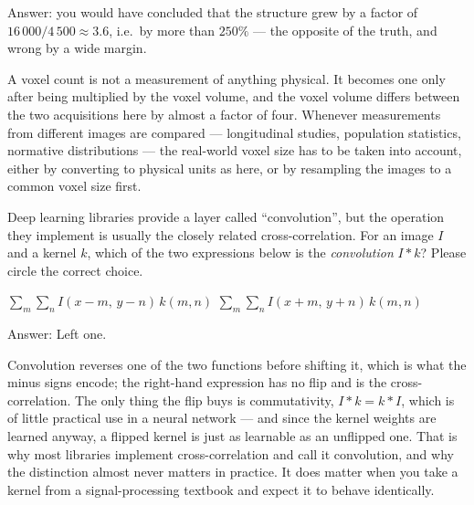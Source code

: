 \documentclass[11pt]{exam}
\newcommand{\answerspace}[1]{\ifprintanswers\else\vspace{#1}\fi}
\begin{document}
\begin{questions}
\begin{parts}
  \begin{solution}
    Answer: you would have concluded that the structure grew by a factor of
    $16\,000 / 4\,500 \approx 3.6$, i.e.\ by more than $250\%$ --- the opposite of the truth, and
    wrong by a wide margin.

    A voxel count is not a measurement of anything physical. It becomes one only after being
    multiplied by the voxel volume, and the voxel volume differs between the two acquisitions here
    by almost a factor of four. Whenever measurements from different images are compared ---
    longitudinal studies, population statistics, normative distributions --- the real-world voxel
    size has to be taken into account, either by converting to physical units as here, or by
    resampling the images to a common voxel size first.
  \end{solution}
\answerspace{4.2cm}

\end{parts}

\question
Deep learning libraries provide a layer called ``convolution'', but the operation they implement is
usually the closely related cross-correlation. For an image $I$ and a kernel $k$, which of the two
expressions below is the \emph{convolution} $I * k$? Please circle the correct choice.

\vspace{2mm}
\begin{center}
  $\displaystyle \sum_m \sum_n I(x-m,\, y-n)\, k(m,n)$
  \hspace{2.0cm}
  $\displaystyle \sum_m \sum_n I(x+m,\, y+n)\, k(m,n)$
\end{center}
\vspace{2mm}

\begin{solution}
  Answer: Left one.

  Convolution reverses one of the two functions before shifting it, which is what the minus signs
  encode; the right-hand expression has no flip and is the cross-correlation. The only thing the
  flip buys is commutativity, $I * k = k * I$, which is of little practical use in a neural network
  --- and since the kernel weights are learned anyway, a flipped kernel is just as learnable as an
  unflipped one. That is why most libraries implement cross-correlation and call it convolution,
  and why the distinction almost never matters in practice. It does matter when you take a kernel
  from a signal-processing textbook and expect it to behave identically.
\end{solution}
\answerspace{1.5cm}


\end{questions}
\end{document}
